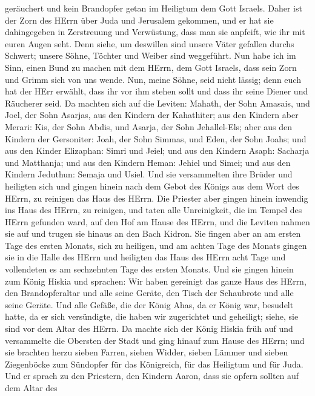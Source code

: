 geräuchert und kein Brandopfer getan im Heiligtum dem Gott Israels.
 Daher ist der Zorn des HErrn über Juda und Jerusalem
gekommen, und er hat sie dahingegeben in Zerstreuung und Verwüstung,
dass man sie anpfeift, wie ihr mit euren Augen seht.  Denn
siehe, um deswillen sind unsere Väter gefallen durchs Schwert; unsere
Söhne, Töchter und Weiber sind weggeführt.  Nun habe ich im
Sinn, einen Bund zu machen mit dem HErrn, dem Gott Israels, dass sein
Zorn und Grimm sich von uns wende.  Nun, meine Söhne, seid
nicht lässig; denn euch hat der HErr erwählt, dass ihr vor ihm stehen
sollt und dass ihr seine Diener und Räucherer seid.  Da
machten sich auf die Leviten: Mahath, der Sohn Amasais, und Joel, der
Sohn Asarjas, aus den Kindern der Kahathiter; aus den Kindern aber
Merari: Kis, der Sohn Abdis, und Asarja, der Sohn Jehallel-Els; aber aus
den Kindern der Gersoniter: Joah, der Sohn Simmas, und Eden, der Sohn
Joahs;  und aus den Kinder Elizaphan: Simri und Jeiel; und
aus den Kindern Asaph: Sacharja und Matthanja;  und aus den
Kindern Heman: Jehiel und Simei; und aus den Kindern Jeduthun: Semaja
und Usiel.  Und sie versammelten ihre Brüder und heiligten
sich und gingen hinein nach dem Gebot des Königs aus dem Wort des HErrn,
zu reinigen das Haus des HErrn.  Die Priester aber gingen
hinein inwendig ins Haus des HErrn, zu reinigen, und taten alle
Unreinigkeit, die im Tempel des HErrn gefunden ward, auf den Hof am
Hause des HErrn, und die Leviten nahmen sie auf und trugen sie hinaus an
den Bach Kidron.  Sie fingen aber an am ersten Tage des
ersten Monats, sich zu heiligen, und am achten Tage des Monats gingen
sie in die Halle des HErrn und heiligten das Haus des HErrn acht Tage
und vollendeten es am sechzehnten Tage des ersten Monats. 
Und sie gingen hinein zum König Hiskia und sprachen: Wir haben gereinigt
das ganze Haus des HErrn, den Brandopferaltar und alle seine Geräte, den
Tisch der Schaubrote und alle seine Geräte.  Und alle
Gefäße, die der König Ahas, da er König war, besudelt hatte, da er sich
versündigte, die haben wir zugerichtet und geheiligt; siehe, sie sind
vor dem Altar des HErrn.  Da machte sich der König Hiskia
früh auf und versammelte die Obersten der Stadt und ging hinauf zum
Hause des HErrn;  und sie brachten herzu sieben Farren,
sieben Widder, sieben Lämmer und sieben Ziegenböcke zum Sündopfer für
das Königreich, für das Heiligtum und für Juda. Und er sprach zu den
Priestern, den Kindern Aaron, dass sie opfern sollten auf dem Altar des
